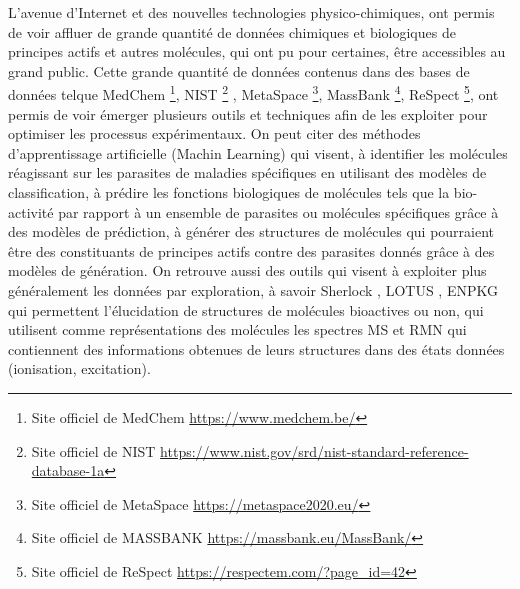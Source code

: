 L’avenue d’Internet et des nouvelles technologies physico-chimiques, ont permis de voir affluer de grande quantité de données chimiques et biologiques de principes actifs et autres molécules, qui ont pu pour certaines, être accessibles au grand public.
Cette grande quantité de données contenus dans des bases de données telque MedChem \footnote{Site officiel de MedChem \href{https://www.medchem.be/}{https://www.medchem.be/}}, NIST \footnote{Site officiel de NIST \href{https://www.nist.gov/srd/nist-standard-reference-database-1a}{https://www.nist.gov/srd/nist-standard-reference-database-1a}} , MetaSpace \footnote{ Site officiel de MetaSpace \href{https://metaspace2020.eu/}{https://metaspace2020.eu/}}, MassBank \footnote{Site officiel de MASSBANK \href{https://massbank.eu/MassBank/}{https://massbank.eu/MassBank/}}, ReSpect \footnote{Site officiel de ReSpect \href{https://respectem.com/?page_id=42}{https://respectem.com/?page\_id=42}}, ont permis de voir émerger plusieurs outils et techniques afin de les exploiter pour optimiser les processus expérimentaux. On peut citer des méthodes d'apprentissage artificielle \cite{saldivar2022natural} (Machin Learning) qui visent, à identifier les molécules réagissant sur les parasites de maladies spécifiques en utilisant des modèles de classification, à prédire les fonctions biologiques de molécules tels que la bio-activité par rapport à un ensemble de parasites ou molécules spécifiques grâce à des modèles de prédiction, à générer des structures de molécules qui pourraient être des constituants de principes actifs contre des parasites donnés grâce à des modèles de génération.
On retrouve aussi des outils qui visent à exploiter plus généralement les données par exploration, à savoir Sherlock \cite{wenk2023sherlock}, LOTUS \cite{rutz2021lotus}, ENPKG \cite{gaudry2023sample} qui permettent l'élucidation de structures de molécules bioactives ou non, qui utilisent comme représentations des molécules les spectres MS et RMN qui contiennent des informations obtenues de leurs structures dans des états données (ionisation, excitation).


